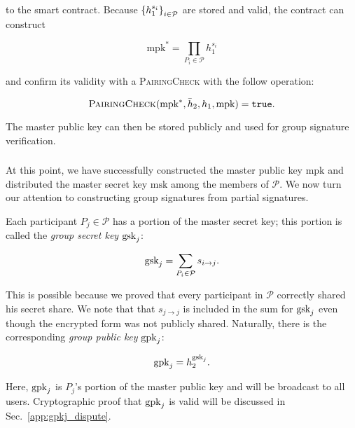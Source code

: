 \noindent
to the smart contract.
Because $\left\{ h_{1}^{s_{i}} \right\}_{i\in\mathcal{P}}$ are stored
and valid, the contract can construct

\begin{equation}
    \text{mpk}^{*} = \prod_{P_{i}\in\mathcal{P}} h_{1}^{s_{i}}
    \label{eq:mpk_dual}
\end{equation}

\noindent
and confirm its validity with a \textsc{PairingCheck}
with the follow operation:

\begin{equation}
    \textsc{PairingCheck}(\text{mpk}^{*},\bar{h}_{2},h_{1},\text{mpk})
        = \texttt{true}.
\end{equation}

\noindent
The master public key can then be stored publicly and used
for group signature verification.



\subsubsection{\GPKSubmission{}}

At this point, we have successfully constructed the master public
key $\text{mpk}$ and distributed
the master secret key $\text{msk}$ among the members of $\mathcal{P}$.
We now turn our attention to constructing group
signatures from partial signatures.

Each participant $P_{j}\in\mathcal{P}$ has a portion of the
master secret key; this portion is called the \emph{group secret key}
$\textrm{gsk}_{j}$:

\begin{equation}
    \textrm{gsk}_{j} = \sum_{P_{i}\in\mathcal{P}} s_{i\to j}.
\end{equation}

\noindent
This is possible because we proved that every participant
in $\mathcal{P}$ correctly shared his secret share.
We note that that $s_{j\to j}$ is included in the sum for
$\textrm{gsk}_{j}$ even though the encrypted form was not publicly shared.
Naturally, there is the corresponding \emph{group public key}
$\textrm{gpk}_{j}$:

\begin{equation}
    \textrm{gpk}_{j} = h_{2}^{\textrm{gsk}_{j}}.
\end{equation}

\noindent
Here, $\textrm{gpk}_{j}$ is $P_{j}$'s portion of the master public key
and will be broadcast to all users.
Cryptographic proof that $\textrm{gpk}_{j}$ is valid will be discussed
in Sec.~\ref{app:gpkj_dispute}.

